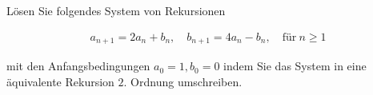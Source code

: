 \begin{exercise}
  Lösen Sie folgendes System von Rekursionen

  \begin{align*}
    a_{n+1} = 2 a_n + b_n, \quad b_{n+1} = 4 a_n - b_n, \quad \text{für}~ n \geq 1
  \end{align*}

  mit den Anfangsbedingungen $a_0 = 1, b_0 = 0$ indem Sie das System in eine äquivalente Rekursion $2.$ Ordnung umschreiben.
\end{exercise}

\begin{comment}
\begin{solution}
  Wir formen zuerst die erste Rekursion um und setzen in die zweite ein

  \begin{align*}
    &a_n = 2a_{n-1} + b_{n-1}
    \Leftrightarrow
    b_{n-1} = a_n - 2a_{n-1} \\
    \Rightarrow~
    & b_n = 4a_{n-1} - 2a_{n-1} + a_n
    =
    2a_{n-1} + a_n\\
    \Rightarrow~
    &b_{n-1} = 2a_{n-2} + a_{n-1}
  \end{align*}

  Setzen wir nun $b_{n-1}$ in die Gleichung aus der ersten Zeile ein erhalten wir also

  \begin{align*}
    a_n
    =
    3a_{n-1} + 2a_{n-2}, \quad \text{für}~ n \geq 2
  \end{align*}

  Mit den Anfangsbedingungen $a_0 = 1, a_1 = 2$. Diese Rekursion $2.$ Ordnung lösen wir nun mithilfe von Satz $4.2$, das charakteristische Polynom unserer Rekursionsgleichung lautet:

  \begin{align*}
    \chi(z)
    =
    z^2 - 3z - 2
  \end{align*}

  Die Nullstellen sind:

  \begin{align*}
    \chi(z) = 0
    \Leftrightarrow
    z_{1,2}
    =
    \frac{3}{2} \pm \frac{\sqrt{17}}{2}
  \end{align*}

  Allgemeine Lösungen unserer Rekursion haben also die Form:

  \begin{align*}
    a_n
    =
    c_0 \Big(\frac{3 +\sqrt{17}}{2}\Big)^n + c_1 \Big(\frac{3 -\sqrt{17}}{2}\Big)^n
  \end{align*}


\end{comment}
